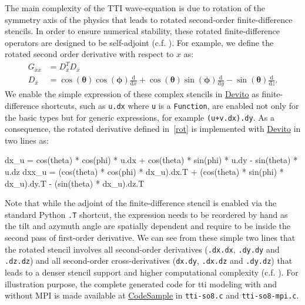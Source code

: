 \documentclass[conference]{IEEEtran}
\newenvironment{Shaded}{}{}
\newcommand{\NormalTok}[1]{{#1}}
\begin{document}
The main complexity of the TTI wave-equation is due to rotation of the
symmetry axis of the physics that leads to rotated second-order
finite-difference stencils. In order to ensure numerical stability,
these rotated finite-difference operators are designed to be
self-adjoint (c.f. \cite{zhang2011, duveneck}). For example, we define
the rotated second order derivative with respect to $x$ as:
%
\begin{equation}
\begin{aligned}
  G_{\bar{x}\bar{x}} &= D_{\bar{x}}^T D_{\bar{x}} \\
  D_{\bar{x}} &= \cos(\mathbf{\theta})\cos(\mathbf{\phi})\frac{\mathrm{d}}{\mathrm{d}x} + \cos(\mathbf{\theta})\sin(\mathbf{\phi})\frac{\mathrm{d}}{\mathrm{d}y} - \sin(\mathbf{\theta})\frac{\mathrm{d}}{\mathrm{d}z}.
\end{aligned}
\label{rot}
\end{equation}
%
 We enable the simple expression of these complex stencils in
\href{https://github.com/devitocodes/devito}{Devito} as
finite-difference shortcuts, such as \texttt{u.dx} where \texttt{u} is a
\texttt{Function}, are enabled not only for the basic types but for
generic expressions, for example
\texttt{(u\phantom{\ }+\phantom{\ }v.dx).dy}. As a consequence, the
rotated derivative defined in~\ref{rot} is implemented with
\href{https://github.com/devitocodes/devito}{Devito} in two lines as:

\begin{Shaded}
\begin{Highlighting}[]
\NormalTok{dx_u = cos(theta) * cos(phi) * u.dx + cos(theta) * sin(phi) * u.dy - sin(theta) * u.dz}
\NormalTok{dxx_u = (cos(theta) * cos(phi) * dx_u).dx.T + (cos(theta) * sin(phi) * dx_u).dy.T - (sin(theta) * dx_u).dz.T}
\end{Highlighting}
\end{Shaded}

Note that while the adjoint of the finite-difference stencil is enabled
via the standard Python \texttt{.T} shortcut, the expression needs to be
reordered by hand as the tilt and azymuth angle are spatially dependent
and require to be inside the second pass of first-order derivative. We
can see from these simple two lines that the rotated stencil involves
all second-order derivatives (\texttt{.dx.dx}, \texttt{.dy.dy} and
\texttt{.dz.dz}) and all second-order cross-derivatives (\texttt{dx.dy},
\texttt{.dx.dz} and \texttt{.dy.dz}) that leads to a denser stencil
support and higher computational complexity (c.f.
\cite{louboutin2016ppf}). For illustration purpose, the complete
generated code for tti modeling with and without MPI is made available
at
\href{https://github.com/mloubout/SC20Paper/tree/master/gencode}{CodeSample}
in \texttt{tti-so8.c} and \texttt{tti-so8-mpi.c}.
\end{document}
